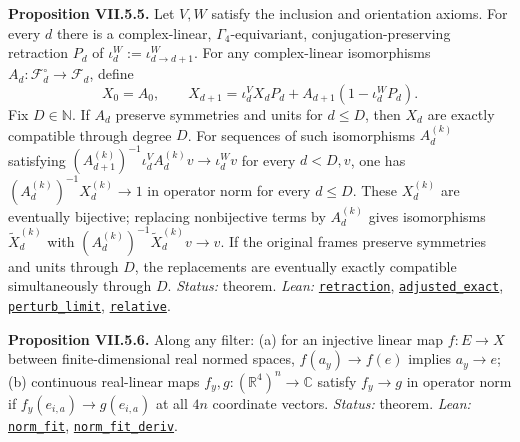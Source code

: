 \documentclass[
  letterpaper,
  11pt]{article}
\begin{document}
\textbf{Proposition VII.5.5.} Let \(V,W\) satisfy the inclusion and
orientation axioms. For every \(d\) there is a complex-linear,
\(\Gamma_4\)-equivariant, conjugation-preserving retraction \(P_d\) of
\(\iota^W_d:=\iota^W_{d\to d+1}\). For any complex-linear isomorphisms
\(A_d:\mathcal F_d^\circ\to\mathcal F_d\), define
\[X_0=A_0,\qquad X_{d+1}=\iota^V_dX_dP_d+A_{d+1}(1-\iota^W_dP_d).\] Fix
\(D\in\mathbb N\). If \(A_d\) preserve symmetries and units for
\(d\le D\), then \(X_d\) are exactly compatible through degree \(D\).
For sequences of such isomorphisms \(A_d^{(k)}\) satisfying
\((A_{d+1}^{(k)})^{-1}\iota^V_dA_d^{(k)}v\to\iota^W_dv\) for every
\(d<D,v\), one has \((A_d^{(k)})^{-1}X_d^{(k)}\to1\) in operator norm
for every \(d\le D\). These \(X_d^{(k)}\) are eventually bijective;
replacing nonbijective terms by \(A_d^{(k)}\) gives isomorphisms
\(\widetilde X_d^{(k)}\) with
\((A_d^{(k)})^{-1}\widetilde X_d^{(k)}v\to v\). If the original frames
preserve symmetries and units through \(D\), the replacements are
eventually exactly compatible simultaneously through \(D\).
\emph{Status:} theorem. \emph{Lean:}
\href{https://github.com/yang-mills-group/OpenAI-YM-20261028/blob/3456e5e75cf8d4cd558955a5c7638fba2d68f464/YM/Extra/WEAK_SCALING_ACTLAW/Adjust.lean\#L35-L55}{\texttt{retraction}},
\href{https://github.com/yang-mills-group/OpenAI-YM-20261028/blob/3456e5e75cf8d4cd558955a5c7638fba2d68f464/YM/Extra/WEAK_SCALING_ACTLAW/Adjust.lean\#L80-L102}{\texttt{adjusted\_exact}},
\href{https://github.com/yang-mills-group/OpenAI-YM-20261028/blob/3456e5e75cf8d4cd558955a5c7638fba2d68f464/YM/Extra/WEAK_SCALING_ACTLAW/Adjust.lean\#L113-L129}{\texttt{perturb\_limit}},
\href{https://github.com/yang-mills-group/OpenAI-YM-20261028/blob/3456e5e75cf8d4cd558955a5c7638fba2d68f464/YM/Extra/WEAK_SCALING_ACTLAW/Adjust.lean\#L144-L148}{\texttt{relative}}.

\textbf{Proposition VII.5.6.} Along any filter: (a) for an injective
linear map \(f:E\to X\) between finite-dimensional real normed spaces,
\(f(a_y)\to f(e)\) implies \(a_y\to e\); (b) continuous real-linear maps
\(f_y,g:(\mathbb R^4)^n\to\mathbb C\) satisfy \(f_y\to g\) in operator
norm if \(f_y(e_{i,a})\to g(e_{i,a})\) at all \(4n\) coordinate vectors.
\emph{Status:} theorem. \emph{Lean:}
\href{https://github.com/yang-mills-group/OpenAI-YM-20261028/blob/3456e5e75cf8d4cd558955a5c7638fba2d68f464/YM/Extra/WEAK_SCALING_ACTLAW/Analysis.lean\#L44-L51}{\texttt{norm\_fit}},
\href{https://github.com/yang-mills-group/OpenAI-YM-20261028/blob/3456e5e75cf8d4cd558955a5c7638fba2d68f464/YM/Extra/WEAK_SCALING_ACTLAW/Analysis.lean\#L63-L70}{\texttt{norm\_fit\_deriv}}.
\end{document}
